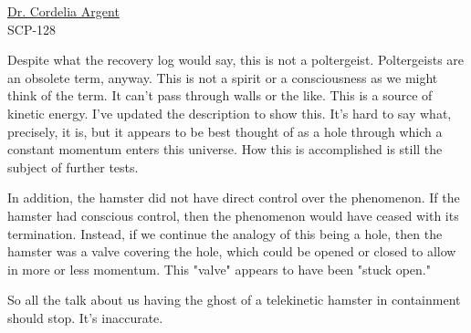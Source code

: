 
\begin{scpbox}

\hyperref[chap:SCP-2460]{Dr. Cordelia Argent}\\
 SCP-128

Despite what the recovery log would say, this is not a poltergeist. Poltergeists are an obsolete term, anyway. This is not a spirit or a consciousness as we might think of the term. It can't pass through walls or the like. This is a source of kinetic energy. I've updated the description to show this. It's hard to say what, precisely, it is, but it appears to be best thought of as a hole through which a constant momentum enters this universe. How this is accomplished is still the subject of further tests.

In addition, the hamster did not have direct control over the phenomenon. If the hamster had conscious control, then the phenomenon would have ceased with its termination. Instead, if we continue the analogy of this being a hole, then the hamster was a valve covering the hole, which could be opened or closed to allow in more or less momentum. This "valve" appears to have been "stuck open."

So all the talk about us having the ghost of a telekinetic hamster in containment should stop. It's inaccurate.

\end{scpbox}



